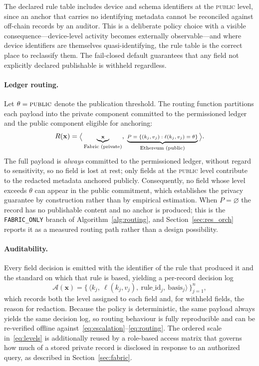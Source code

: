 \documentclass[final,5p,times,twocolumn]{elsarticle}
\begin{document}
The declared rule table includes device and schema identifiers at the \textsc{public} level, since an anchor that carries no identifying metadata cannot be reconciled against off-chain records by an auditor. This is a deliberate policy choice with a visible consequence---device-level activity becomes externally observable---and where device identifiers are themselves quasi-identifying, the rule table is the correct place to reclassify them. The fail-closed default guarantees that any field not explicitly declared publishable is withheld regardless.

\paragraph*{\textbf{Ledger routing.}}
Let $\theta=\textsc{public}$ denote the publication threshold. The routing function partitions each payload into the private component committed to the permissioned ledger and the public component eligible for anchoring:
\begin{equation}
\scriptsize
  R(\mathbf{x})
  =
  \Big\langle
    \underbrace{\mathbf{x}}_{\text{Fabric (private)}},\;
    \underbrace{P=\{(k_j,v_j): \ell(k_j,v_j)=\theta\}}_{\text{Ethereum (public)}}
  \Big\rangle.
  \label{eq:routing}
\end{equation}
The full payload is \emph{always} committed to the permissioned ledger, without regard to sensitivity, so no field is lost at rest; only fields at the \textsc{public} level contribute to the redacted metadata anchored publicly. Consequently, no field whose level exceeds $\theta$ can appear in the public commitment, which establishes the privacy guarantee by construction rather than by empirical estimation. When $P=\varnothing$ the record has no publishable content and no anchor is produced; this is the \texttt{FABRIC\_ONLY} branch of Algorithm~\ref{alg:routing}, and Section~\ref{sec:res_orch} reports it as a measured routing path rather than a design possibility.

\paragraph*{\textbf{Auditability.}}
Every field decision is emitted with the identifier of the rule that produced it and the standard on which that rule is based, yielding a per-record decision log
\begin{equation}
  \mathcal{A}(\mathbf{x})
  = \big\{\,\langle k_j,\ \ell(k_j,v_j),\ \mathrm{rule\_id}_j,\ \mathrm{basis}_j\rangle\,\big\}_{j=1}^{n},
  \label{eq:audit}
\end{equation}
which records both the level assigned to each field and, for withheld fields, the reason for redaction. Because the policy is deterministic, the same payload always yields the same decision log, so routing behaviour is fully reproducible and can be re-verified offline against~\eqref{eq:escalation}--\eqref{eq:routing}. The ordered scale in~\eqref{eq:levels} is additionally reused by a role-based access matrix that governs how much of a stored private record is disclosed in response to an authorized query, as described in Section~\ref{sec:fabric}.
\end{document}
